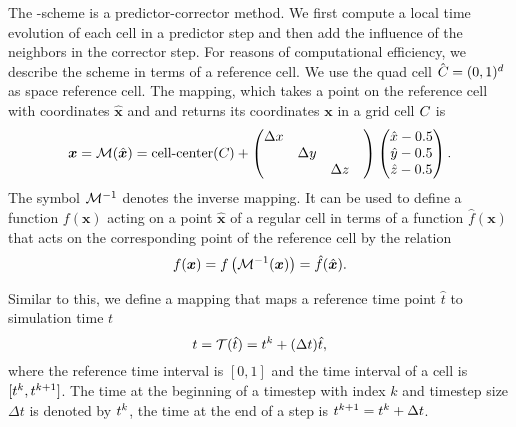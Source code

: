 The \aderdg{}-scheme is a predictor-corrector method.
We first compute a local time evolution of each cell in a predictor step and then add the influence of the neighbors in the corrector step.
For reasons of computational efficiency, we describe the scheme in terms of a reference cell.
We use the quad cell $\hat{C_{}} = (0, 1)^d$ as space reference cell.
The mapping, which takes a point on the reference cell with coordinates $\hat{\bm{x}}$ and and returns its coordinates $\bm{x}$ in a grid cell $C_{}$ is
\begin{equation}\label{eq:space-mapping}
  \bm{x} = \mathcal{M} (\hat{\bm{x}}) =
  \operatorname{cell-center}(C_{}) +
\begin{pmatrix}
\Delta x && \\
&\Delta y & \\
&&\Delta z&
\end{pmatrix}
  \begin{pmatrix}
    \hat{x} - 0.5\\
    \hat{y} - 0.5\\
    \hat{z} - 0.5
  \end{pmatrix}.
\end{equation}
The symbol $\mathcal{M}^{-1}$ denotes the inverse mapping.
It can be used to define a function $f(\bm{x})$ acting on a point $\hat{\bm{x}}$ of a regular cell in terms of a function $\hat{f}(\bm{x})$ that acts on the corresponding point of the reference cell by the relation
\begin{equation}
  \label{eq:function-ref-cell}
  f(\bm{x}) = f\left( \mathcal{M}^{-1}(\bm{x}) \right) = \hat{f}(\hat{\bm{x}}).
\end{equation}

Similar to this, we define a mapping that maps a reference time point $\hat t$ to simulation time $t$
\newcommand{\timeMapping}{\mathcal{T}}
\begin{equation}
  \label{eq:time-mapping}
  t = \timeMapping(\hat{t}) = \curTime + (\Delta t) \hat{t},
\end{equation}
where the reference time interval is $[0,1]$ and the time interval of a cell is $[t^k, t^{k+1}]$.
The time at the beginning of a timestep with index $k$ and timestep size $\Delta t$ is denoted by $t^k$, the time at the end of a step is $t^{k+1} = t^k + \Delta t$.

